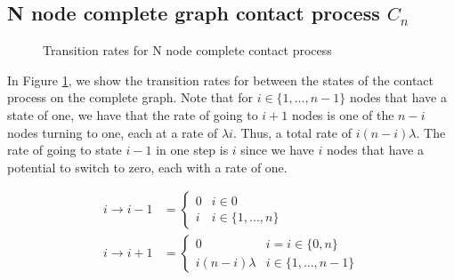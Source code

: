 \subsection{N node complete graph contact process \texorpdfstring{$C_n$}{Cn}}

\begin{figure}[H]
    \centering
    \caption{Transition rates for N node complete contact process}
    \label{fig:complete_contact_n_node_rates}
\end{figure}

In Figure \ref{fig:complete_contact_n_node_rates}, we show the transition rates for between the states of the contact process on the complete graph.
Note that for $i \in \{1,\ldots, n - 1\} $ nodes that have a state of one, we have that the rate of going to $i + 1$ nodes is one of the $n - i$ nodes turning to one, each at a rate of $\lambda i$.
Thus, a total rate of $i (n - i) \lambda$.
The rate of going to state $i - 1$ in one step is $i$ since we have $i$ nodes that have a potential to switch to zero, each with a rate of one.

\begin{align*}
    i \to i - 1 &= \begin{cases}
        0 & i \in 0\\
        i & i \in \{1,\ldots, n\}
    \end{cases}\\
    i \to i + 1 &= \begin{cases}
        0 & i = i \in \{0, n\}\\
        i(n - i) \lambda & i \in \{1,\ldots, n-1\}
    \end{cases}
\end{align*}

